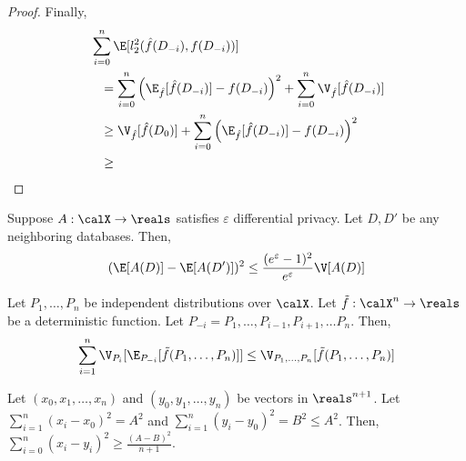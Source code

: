 \begin{proof}
  Finally,
  \begin{align*}
    &\:\sum_{i=0}^n \E[l_2^2(\hat{f}(D_{-i}), f(D_{-i}))] \\ 
    &\hspace{1em} = \sum_{i=0}^n
    \left(\E_{\hat{f}}[\hat{f}(D_{-i})] - f(D_{-i}) \right)^2 
        + \sum_{i=0}^n \V_{\hat{f}}[\hat{f}(D_{-i})] \\
    &\hspace{1em} \geq \V_{\hat{f}}[\hat{f}(D_{0})] + \sum_{i=0}^n 
    \left(\E_{\hat{f}}[\hat{f}(D_{-i})] - f(D_{-i}) \right)^2 \\
    &\hspace{1em} \geq 
  \end{align*}
\end{proof} 

\begin{lemma}\label{chap1-lem:var-lb}
  Suppose $A : \calX \rightarrow \reals$ satisfies $\varepsilon$ differential privacy.
  Let $D,D'$ be any neighboring databases. Then,
  \[
    (\E[A(D)] - \E[A(D')])^2 \leq
    \frac{(e^\varepsilon-1)^2}{e^\varepsilon}\V[A(D)]
  \]
\end{lemma}

\begin{lemma}\label{chap1-lem:var-lb}
  Let $P_1,\ldots, P_n$ be independent distributions over $\calX$. Let
  $\tilde{f} : \calX^n \rightarrow \reals$ be a deterministic function. 
  Let $P_{-i} = P_1,\ldots, P_{i-1}, P_{i+1},\ldots P_n$. 
  Then,
  \[
    \sum_{i=1}^n \V_{P_i}[\E_{P_{-i}}[\tilde{f}(P_1,\ldots, P_n)]] \leq
    \V_{P_1,\ldots, P_n}[\tilde{f}(P_1,\ldots, P_n)]
  \]
\end{lemma}

\begin{lemma}\label{chap1-lem:vec-lb}
  Let $(x_0,x_1,\ldots, x_n)$ and $(y_0,y_1,\ldots, y_n)$ be vectors in
  $\reals^{n+1}$. Let $\sum_{i=1}^n (x_i-x_0)^2 = A^2$ and $\sum_{i=1}^n
  (y_i-y_0)^2 = B^2 \leq A^2$. Then, $\sum_{i=0}^n (x_i-y_i)^2 \geq
  \frac{(A-B)^2}{n+1}$.
\end{lemma}
